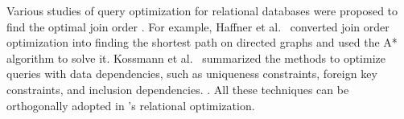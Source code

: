 Various studies of query optimization for relational databases were proposed to find the optimal join order \cite{IbarakiK84,optimize-nested-vldb-1986,Haffnerjoinorder,data-dependency-join}.
For example, 
Haffner et al.~\cite{Haffnerjoinorder} converted join order optimization into finding the shortest path on directed graphs and used the A* algorithm to solve it.
Kossmann et al.~\cite{data-dependency-join} summarized the methods to optimize queries with data dependencies, such as uniqueness constraints, foreign key constraints, and inclusion dependencies.
.
All these techniques can be orthogonally adopted in \name's relational optimization.

